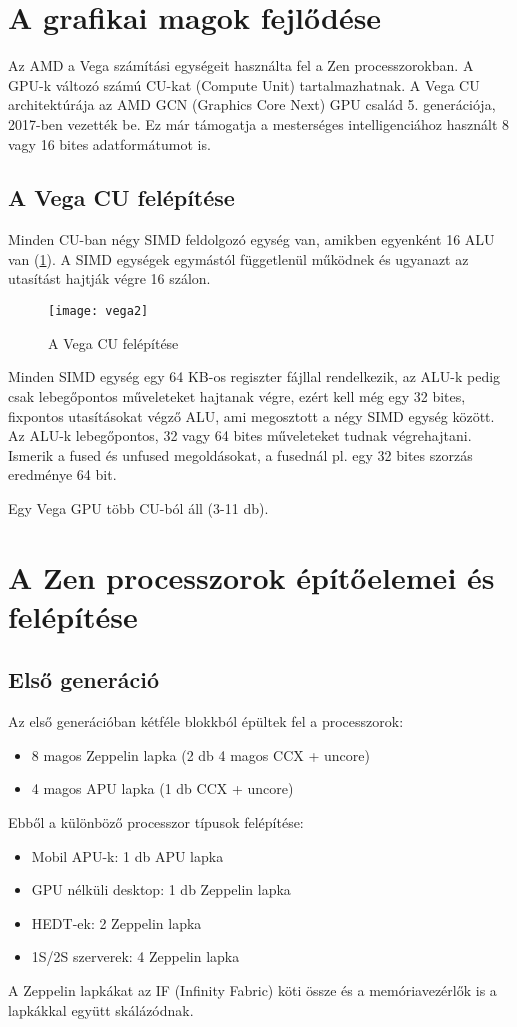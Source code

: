 \section{A grafikai magok fejlődése}
Az AMD a Vega számítási egységeit használta fel a Zen processzorokban.
A GPU-k változó számú CU-kat (Compute Unit) tartalmazhatnak.
A Vega CU architektúrája az AMD GCN (Graphics Core Next) GPU család 5. generációja, 2017-ben vezették be.
Ez már támogatja a mesterséges intelligenciához használt 8 vagy 16 bites adatformátumot is.

\subsection{A Vega CU felépítése}
Minden CU-ban négy SIMD feldolgozó egység van, amikben egyenként 16 ALU van (\ref{fig:vega2}).
A SIMD egységek egymástól függetlenül működnek és ugyanazt az utasítást hajtják végre 16 szálon.
\begin{figure}[H]
    \texttt{[image: vega2]}
    \centering
    \caption{A Vega CU felépítése}
    \label{fig:vega2}
\end{figure}
Minden SIMD egység egy 64 KB-os regiszter fájllal rendelkezik, az ALU-k pedig csak lebegőpontos műveleteket hajtanak végre, ezért kell még egy 32 bites, fixpontos utasításokat végző ALU, ami megosztott a négy SIMD egység között.
Az ALU-k lebegőpontos, 32 vagy 64 bites műveleteket tudnak végrehajtani.
Ismerik a fused és unfused megoldásokat, a fusednál pl. egy 32 bites szorzás eredménye 64 bit.

Egy Vega GPU több CU-ból áll (3-11 db).

\section{A Zen processzorok építőelemei és felépítése}

\subsection{Első generáció}
Az első generációban kétféle blokkból épültek fel a processzorok:
\begin{itemize}
    \item 8 magos Zeppelin lapka (2 db 4 magos CCX + uncore)
    \item 4 magos APU lapka (1 db CCX + uncore)
\end{itemize}

Ebből a különböző processzor típusok felépítése:
\begin{itemize}
    \item Mobil APU-k: 1 db APU lapka
    \item GPU nélküli desktop: 1 db Zeppelin lapka
    \item HEDT-ek: 2 Zeppelin lapka
    \item 1S/2S szerverek: 4 Zeppelin lapka
\end{itemize}
A Zeppelin lapkákat az IF (Infinity Fabric) köti össze és a memóriavezérlők is a lapkákkal együtt skálázódnak.

